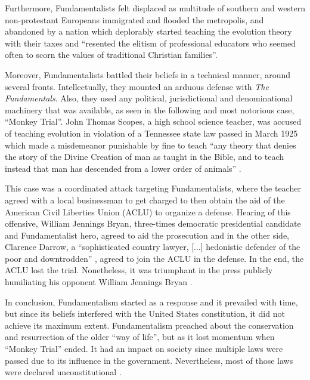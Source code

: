 \documentclass{article}
\begin{document}
  Furthermore, Fundamentalists felt displaced as multitude of southern and western non-protestant Europeans immigrated and flooded the metropolis, and abandoned by a nation which deplorably started teaching the evolution theory with their taxes and ``resented the elitism of professional educators who seemed often to scorn the values of traditional Christian families''. \cite{RiseFundamentalism}
  
  Moreover, Fundamentalists battled their beliefs in a technical manner, around several fronts. Intellectually, they mounted an arduous defense with \textit{The Fundamentals}. Also, they used any political, jurisdictional and denominational machinery that was available, as seen in the following and most notorious case, ``Monkey Trial''. John Thomas Scopes, a high school science teacher, was accused of teaching evolution in violation of a Tennessee state law passed in March 1925 which made a misdemeanor punishable by fine to teach ``any theory that denies the story of the Divine Creation of man as taught in the Bible, and to teach instead that man has descended from a lower order of animals'' \cite{law}.
  
  This case was a coordinated attack targeting Fundamentalists, where the teacher agreed with a local businessman to get charged to then obtain the aid of the American Civil Liberties Union (ACLU) to organize a defense. Hearing of this offensive, William Jennings Bryan, three-times democratic presidential candidate and Fundamentalist hero, agreed to aid the prosecution and in the other side, Clarence Darrow, a ``sophisticated country lawyer, [...] hedonistic defender of the poor and downtrodden'' \cite{clarence1}, agreed to join the ACLU in the defense. In the end, the ACLU lost the trial. Nonetheless, it was triumphant in the press publicly humiliating his opponent William Jennings Bryan \cite{MonkeyTrial}.
  
  In conclusion, Fundamentalism started as a response and it prevailed with time, but since its beliefs interfered with the United States constitution, it did not achieve its maximum extent. Fundamentalism preached about the conservation and resurrection of the older ``way of life'', but as it lost momentum when ``Monkey Trial'' ended. It had an impact on society since multiple laws were passed due to its influence in the government. Nevertheless, most of those laws were declared unconstitutional \cite{repeal}.
  \pagebreak
  \makeworkscited
\end{document}

